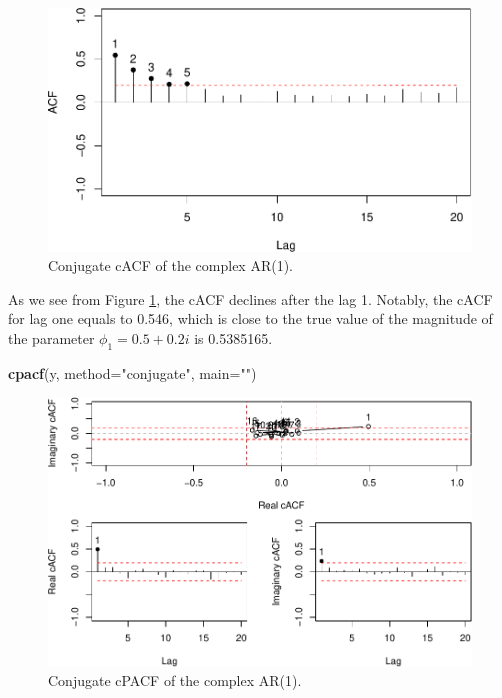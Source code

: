\documentclass[
]{book}
\newenvironment{Shaded}{\begin{snugshade}}{\end{snugshade}}
\newcommand{\DataTypeTok}[1]{\textcolor[rgb]{0.13,0.29,0.53}{#1}}
\newcommand{\KeywordTok}[1]{\textcolor[rgb]{0.13,0.29,0.53}{\textbf{#1}}}
\newcommand{\NormalTok}[1]{#1}
\newcommand{\StringTok}[1]{\textcolor[rgb]{0.31,0.60,0.02}{#1}}
\begin{document}
\begin{figure}
\centering
\includegraphics{Svetunkov---Svetunkov---Complex-Valued-Econometrics_files/figure-latex/complexAR1cACF-1.pdf}
\caption{\label{fig:complexAR1cACF}Conjugate cACF of the complex AR(1).}
\end{figure}

As we see from Figure \ref{fig:complexAR1cACF}, the cACF declines after the lag 1. Notably, the cACF for lag one equals to 0.546, which is close to the true value of the magnitude of the parameter \(\phi_1=0.5+0.2i\) is 0.5385165.

\begin{Shaded}
\begin{Highlighting}[]
\KeywordTok{cpacf}\NormalTok{(y, }\DataTypeTok{method=}\StringTok{"conjugate"}\NormalTok{, }\DataTypeTok{main=}\StringTok{""}\NormalTok{)}
\end{Highlighting}
\end{Shaded}

\begin{figure}
\centering
\includegraphics{Svetunkov---Svetunkov---Complex-Valued-Econometrics_files/figure-latex/complexAR1cPACF-1.pdf}
\caption{\label{fig:complexAR1cPACF}Conjugate cPACF of the complex AR(1).}
\end{figure}
\end{document}
